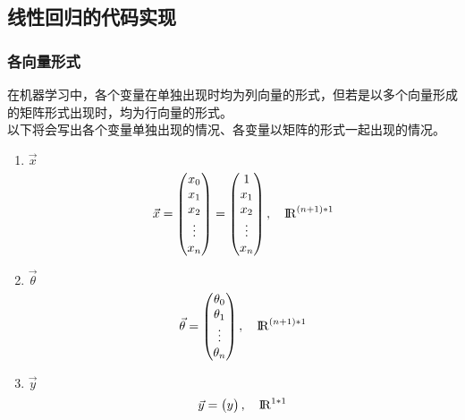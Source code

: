 \subsection{线性回归的代码实现}

\subsubsection{各向量形式}
在机器学习中，各个变量在单独出现时均为列向量的形式，但若是以多个向量形成的矩阵形式出现时，均为行向量的形式。\\
以下将会写出各个变量单独出现的情况、各变量以矩阵的形式一起出现的情况。
\begin{enumerate}
\item $\vec{x}$
\begin{equation}
	\vec{x} = \left(\begin{matrix}
				x_0 \\ x_1 \\ x_2 \\ \vdots \\ x_n
			\end{matrix}\right)
			= \left(\begin{matrix}
				1 \\ x_1 \\ x_2 \\ \vdots \\ x_n
			\end{matrix}\right), \quad {\rm I\!R}^{{(n+1)*1}}
\end{equation}

\item $\vec{\theta}$
\begin{equation}
	\vec{\theta} = \left(\begin{matrix}
					\theta_0 \\ \theta_1 \\ \vdots \\ \theta_n
				\end{matrix}\right), \quad {\rm I\!R}^{{(n+1)*1}}
\end{equation}

\item $\vec{y}$
\begin{equation}
	\vec{y} = \left(\begin{matrix}
				y
			\end{matrix}\right), \quad {\rm I\!R}^{1*1}
\end{equation}


\end{enumerate}
